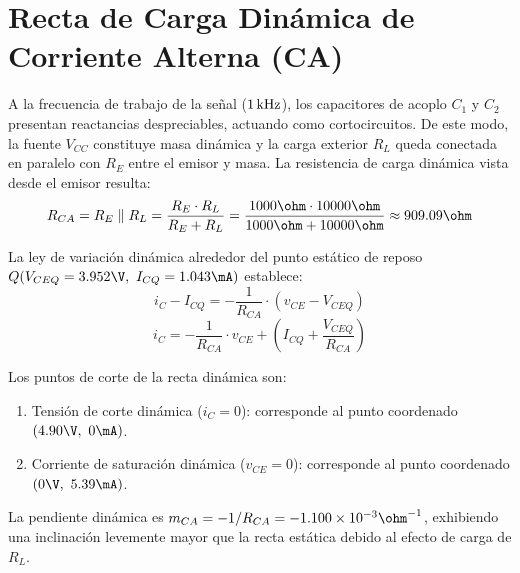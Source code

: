 \section{Recta de Carga Dinámica de Corriente Alterna (CA)}

A la frecuencia de trabajo de la señal ($1\,\mathrm{kHz}$), los capacitores de acoplo $C_1$ y $C_2$ presentan reactancias
despreciables, actuando como cortocircuitos. De este modo, la fuente $V_{CC}$ constituye masa dinámica y la carga
exterior $R_L$ queda conectada en paralelo con $R_E$ entre el emisor y masa. La resistencia de carga dinámica
vista desde el emisor resulta:
\begin{equation}
  R_{CA} = R_E \parallel R_L = \frac{R_E \cdot R_L}{R_E + R_L} = \frac{1000\ohm \cdot 10000\ohm}{1000\ohm + 10000\ohm} \approx 909.09\ohm
  \label{eq:RCA_val}
\end{equation}

La ley de variación dinámica alrededor del punto estático de reposo $Q(V_{CEQ} = 3.952\V,\ I_{CQ} = 1.043\mA)$ establece:
\begin{equation}
  i_C - I_{CQ} = -\frac{1}{R_{CA}} \cdot (v_{CE} - V_{CEQ})
\end{equation}
\begin{equation}
  i_C = -\frac{1}{R_{CA}} \cdot v_{CE} + \left(I_{CQ} + \frac{V_{CEQ}}{R_{CA}}\right)
  \label{eq:recta_ca}
\end{equation}

Los puntos de corte de la recta dinámica son:
\begin{enumerate}
  \item Tensión de corte dinámica ($i_C = 0$):
    corresponde al punto coordenado $(4.90\V,\ 0\mA)$.
  \item Corriente de saturación dinámica ($v_{CE} = 0$):
    corresponde al punto coordenado $(0\V,\ 5.39\mA)$.
\end{enumerate}

La pendiente dinámica es $m_{CA} = -1/R_{CA} = -1.100 \times 10^{-3}\ohm^{-1}$, exhibiendo una inclinación levemente
mayor que la recta estática debido al efecto de carga de $R_L$.

